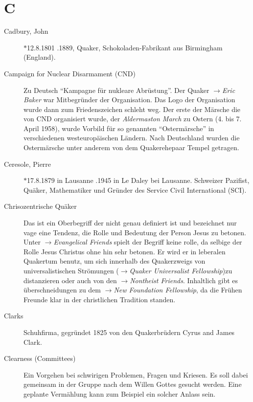 \section*{C}

\articlesize

\begin{description}

 \item[Cadbury, John] $\ast$12.8.1801 .1889, Quaker, Schokoladen-Fabrikant aus Birmingham (England).

 \item[Campaign for Nuclear Disarmament (CND)] Zu Deutsch ``Kampagne für nukleare Abrüstung''. Der Quaker $\to$\textit{Eric Baker} war Mitbegründer der Organisation. Das Logo der Organisation wurde dann zum Friedenszeichen schleht weg. Der erste der Märsche die von CND organisiert wurde, der \textit{Aldermaston March} zu Ostern (4. bis 7. April 1958), wurde Vorbild für so genannten ``Ostermärsche'' in verschiedenen westeuropäischen Ländern. Nach Deutschland wurden die Ostermärsche unter anderem von dem Quakerehepaar Tempel getragen.

 \item[Ceresole, Pierre] $\ast$17.8.1879 in Lausanne .1945 in Le Daley bei Lausanne. Schweizer Pazifist, Quäker, Mathematiker und Gründer des Service Civil International (SCI).

 \item[Chrisozentrische Quäker] Das ist ein Oberbegriff der nicht genau definiert ist und bezeichnet nur vage eine Tendenz, die Rolle und Bedeutung der Person Jesus zu betonen. Unter $\to$\textit{Evangelical Friends} spielt der Begriff keine rolle, da selbige der Rolle Jesus Christus ohne hin sehr betonen. Er wird er in leberalen Quakertum benutz, um sich innerhalb des Quakerzweigs von universalistischen Strömungen ($\to$\textit{Quaker Universalist Fellowship})zu distanzieren oder auch von den $\to$\textit{Nontheist Friends}. Inhaltlich gibt es überschneidungen zu dem $\to$\textit{New Foundation Fellowship}, da die Frühen Freunde klar in der christlichen Tradition standen.

 \item[Clarks] Schuhfirma, gegründet 1825 von den Quakerbrüdern Cyrus and James Clark.
 
 \item[Clearness (Committees)] Ein Vorgehen bei schwirigen Problemen, Fragen und Kriesen. Es soll dabei gemeinsam in der Gruppe nach dem Willen Gottes gesucht werden. Eine geplante Vermählung kann zum Beispiel ein solcher Anlass sein.


\end{description}
